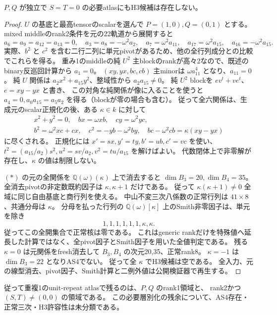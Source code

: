 \begin{theorem}
\label{thm:cubic-third-root-unit-independent-zero-quartic}
$P,Q$ が独立で $S=T=0$ の必要atlasにもH3候補は存在しない。
\end{theorem}
\begin{proof}
$U$ の基底と最高tensorのscalarを選んで
$P=(1,0),Q=(0,1)$ とする。
mixed middleのrank2条件を元の22軌道から展開すると
\[
 a_6=a_9=a_{12}=a_{13}=0,\quad
 a_3=a_8=-\omega^2a_2,\quad a_7=\omega^2a_{11},\quad
 a_{17}=\omega^2a_{15},\quad a_{16}=-\omega^2a_{15}.
\]
実際、$b^2$ と $c^2$ を含む二行二列に単元pivotがあるため、他の全行列成分との比較でこれらを得る。
重み1のmiddleの純 $U^2$ 主blockのrankが高々2なので、既述のbinary反巡回計算から $a_1=0$。
$(xy,yx,bc,cb)$ 主minorは $\omega a_{11}^4$ となり、$a_{11}=0$。
純 $U$ 関係は $a_2x^2+a_{15}y^2$、整域性から $a_2a_{15}\ne0$。
純 $U^2$ blockを $ev^t+ve^t$、$e=xy-yx$ と書き、
この対角な純関係が像に入ることを使うと
$a_4=0,a_0a_{15}=a_5a_2$ を得る（blockが零の場合も含む）。
従って全六関係は、生成元のscalar正規化の後、ある $\kappa\in k$ に対して
\[
 \begin{gathered}
 x^2+y^2=0,\quad bx=\omega xb,\quad cy=\omega^2yc,\\
 b^2=\omega^2xc+cx,\quad c^2=-yb-\omega^2by,\quad
 bc-\omega^2cb=\kappa(xy-yx)
 \end{gathered}
\tag{*}
\]
に尽くされる。
正規化には $x'=sx,y'=ty,b'=ub,c'=vc$ を使い、
$t^2=(a_{15}/a_2)s^2,u^2=sv/a_2,v^2=tu/a_{15}$ を解けばよい。
代数閉体上で非零解が存在し、$\kappa$ の値は制限しない。

$(*)$ の元の全関係を $\mathbb Q(\omega)(\kappa)$ 上で消去すると
$\dim B_3=20,\dim B_4=35$。
全消去pivotの非定数既約因子は $\kappa,\kappa+1$ だけである。
従って $\kappa(\kappa+1)\ne0$ 全域に同じ自由基底と商行列を使える。
中山不変三次八係数の正常行列は $41\times8$、共通分母は $\kappa$。
分母を払った行列の $\mathbb Q(\omega)[\kappa]$ 上のSmith非零因子は、単元を除き
\[
 1,1,1,1,1,1,\kappa,\kappa.
\]
従ってこの全開集合で正常核は零である。
これはgeneric rankだけを特殊値へ延長した計算ではなく、全pivot因子とSmith因子を用いた全値判定である。
残る $\kappa=0$ は元関係をfresh消去して $B_3,B_4$ の次元20,35、正常rank8。
$\kappa=-1$ は $\dim B_3=22$ となりAS4でない。
従って全 $\kappa$ でH3候補は空である。
全入力、元の線型消去、pivot因子、Smith計算と二例外値は公開検証器で再生する。
\end{proof}

従って重複1のunit-repeat atlasで残るのは、$P,Q$ のrank1領域と、
rank2かつ $(S,T)\ne(0,0)$ の領域である。
この必要層別化の残余について、AS4存在・正常三次・H3許容性は未分類である。
